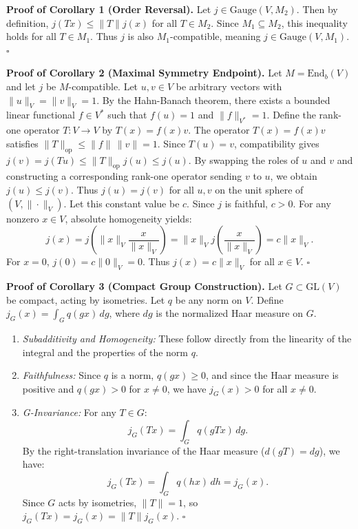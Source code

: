 \documentclass[
  11pt,
]{article}
\providecommand{\tightlist}{%
  \setlength{\itemsep}{0pt}\setlength{\parskip}{0pt}}
\providecommand{\tightlist}{%
  \setlength{\itemsep}{0pt}\setlength{\parskip}{0pt}}
\begin{document}
\textbf{Proof of Corollary 1 (Order Reversal).} Let \(j \in \text{Gauge}(V, M_2)\). Then by definition, \(j(T x) \leq \|T\| j(x)\) for all \(T \in M_2\). Since \(M_1 \subseteq M_2\), this inequality holds for all \(T \in M_1\). Thus \(j\) is also \(M_1\)-compatible, meaning \(j \in \text{Gauge}(V, M_1).\) \(\square\)

\textbf{Proof of Corollary 2 (Maximal Symmetry Endpoint).} Let \(M = \mathrm{End}_b(V)\) and let \(j\) be \(M\)-compatible. Let \(u, v \in V\) be arbitrary vectors with \(\|u\|_V = \|v\|_V = 1\). By the Hahn-Banach theorem, there exists a bounded linear functional \(f \in V^*\) such that \(f(u) = 1\) and \(\|f\|_{V^*} = 1\). Define the rank-one operator \(T: V \to V\) by \(T(x) = f(x) v\).
The operator \(T(x)=f(x)v\) satisfies \(\|T\|_{\text{op}}\le \|f\|\,\|v\|=1\). Since \(T(u)=v\), compatibility gives \(j(v)=j(Tu)\le \|T\|_{\text{op}}j(u)\le j(u)\).
By swapping the roles of \(u\) and \(v\) and constructing a corresponding rank-one operator sending \(v\) to \(u\), we obtain \(j(u) \leq j(v)\). Thus \(j(u) = j(v)\) for all \(u, v\) on the unit sphere of \((V, \|\cdot\|_V)\). Let this constant value be \(c\). Since \(j\) is faithful, \(c > 0\). For any nonzero \(x \in V\), absolute homogeneity yields:
\[j(x) = j\left(\|x\|_V \frac{x}{\|x\|_V}\right) = \|x\|_V j\left(\frac{x}{\|x\|_V}\right) = c \|x\|_V.\]
For \(x = 0\), \(j(0) = c \|0\|_V = 0\). Thus \(j(x) = c \|x\|_V\) for all \(x \in V.\) \(\square\)

\textbf{Proof of Corollary 3 (Compact Group Construction).} Let \(G \subset \text{GL}(V)\) be compact, acting by isometries. Let \(q\) be any norm on \(V\). Define \(j_G(x) = \int_G q(gx) \, dg\), where \(dg\) is the normalized Haar measure on \(G\).

\begin{enumerate}
\def\labelenumi{\arabic{enumi}.}
\tightlist
\item
  \emph{Subadditivity and Homogeneity:} These follow directly from the linearity of the integral and the properties of the norm \(q\).
\item
  \emph{Faithfulness:} Since \(q\) is a norm, \(q(gx) \geq 0\), and since the Haar measure is positive and \(q(gx) > 0\) for \(x \neq 0\), we have \(j_G(x) > 0\) for all \(x \neq 0\).
\item
  \emph{G-Invariance:} For any \(T \in G\):
  \[j_G(T x) = \int_G q(g T x) \, dg.\]
  By the right-translation invariance of the Haar measure (\(d(gT) = dg\)), we have:
  \[j_G(T x) = \int_G q(h x) \, dh = j_G(x).\]
  Since \(G\) acts by isometries, \(\|T\| = 1\), so \(j_G(T x) = j_G(x) = \|T\| j_G(x).\) \(\square\)
\end{enumerate}
\end{document}
